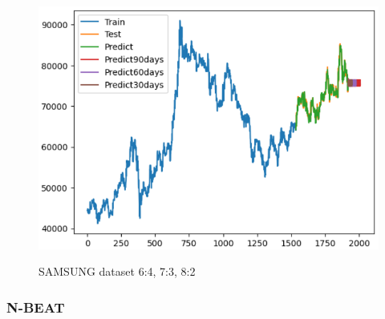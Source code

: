 \documentclass[conference]{IEEEtran}
\begin{document}
\begin{figure}[H]
\begin{minipage}{0.15\textwidth}
    \label{fig:2}
    \end{minipage}%
    \begin{minipage}{0.15\textwidth}
    \centering
    \includegraphics[width=1\textwidth]{Image/XGBoost/XGBoost_SAMSUNG_8_2.png}

    \label{fig:3}
    \end{minipage}
    \caption{ SAMSUNG dataset 6:4, 7:3, 8:2 }
\end{figure}




\subsubsection{N-BEAT}
\end{document}
